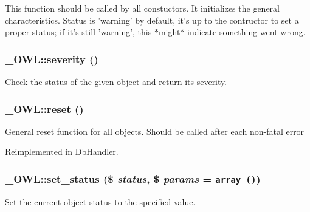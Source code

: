 This function should be called by all constuctors. It initializes the general characteristics. Status is 'warning' by default, it's up to the contructor to set a proper status; if it's still 'warning', this $\ast$might$\ast$ indicate something went wrong. \hypertarget{class__OWL_5b88d497ccf2305fa411b9bd3f4bfe6f}{
\subsubsection{\setlength{\rightskip}{0pt plus 5cm}\_\-OWL::severity ()}}
\label{class__OWL_5b88d497ccf2305fa411b9bd3f4bfe6f}


Check the status of the given object and return its severity. \hypertarget{class__OWL_2f2a042bcf31965194c03033df0edc9b}{
\subsubsection{\setlength{\rightskip}{0pt plus 5cm}\_\-OWL::reset ()}}
\label{class__OWL_2f2a042bcf31965194c03033df0edc9b}


General reset function for all objects. Should be called after each non-fatal error 

Reimplemented in \hyperlink{classDbHandler_9982df4830f05803935bb31bac7fae3d}{DbHandler}.\hypertarget{class__OWL_ea912d0ede9b3c2a69b79072d94d4787}{
\subsubsection{\setlength{\rightskip}{0pt plus 5cm}\_\-OWL::set\_\-status (\$ {\em status}, \$ {\em params} = {\tt array~()})}}
\label{class__OWL_ea912d0ede9b3c2a69b79072d94d4787}


Set the current object status to the specified value.

